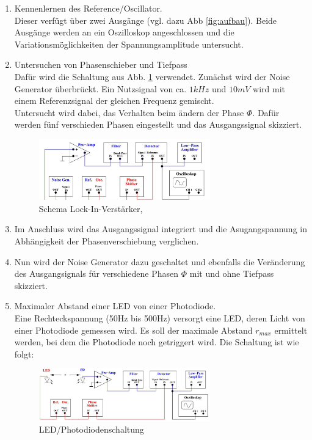 \begin{enumerate}
\item Kennenlernen des Reference/Oscillator.\\ Dieser verfügt über zwei
Ausgänge (vgl. dazu Abb \ref{fig:aufbau}).
Beide Ausgänge werden an ein Oszilloskop angeschlossen und die Variationsmöglichkeiten
der Spannungsamplitude untersucht. 
\item Untersuchen von Phasenschieber und Tiefpass\\
Dafür wird die Schaltung aus Abb. \ref{fig:aufbau_schema2} verwendet.
Zunächst wird der Noise Generator überbrückt. Ein Nutzsignal von ca. $1kHz$ und $10mV$
wird mit einem Referenzsignal der gleichen Frequenz gemischt.\\
Untersucht wird dabei, das Verhalten beim ändern der Phase $\Phi$.
Dafür werden fünf verschieden Phasen eingestellt und das Ausgangssignal skizziert.
\begin{figure}[H]
    \centering
    \includegraphics[width=0.7\textwidth]{bilder/aufbau_schema2.jpg}
    \caption{Schema Lock-In-Verstärker,\cite[4]{Anleitung}}
    \label{fig:aufbau_schema2}
\end{figure}
\item Im Anschluss wird das Ausgangssignal integriert und die Asugangspannung
in Abhängigkeit der Phasenverschiebung verglichen.
\item Nun wird der Noise Generator dazu geschaltet und ebenfalls
die Veränderung des Ausgangsignals für verschiedene Phasen $\Phi$ mit und ohne Tiefpass
skizziert.
\item Maximaler Abstand einer LED von einer Photodiode.\\
Eine Rechteckspannung (50Hz bis 500Hz) versorgt eine LED, deren
Licht von einer Photodiode gemessen wird. Es soll der maximale Abstand $r_{max}$
ermittelt werden, bei dem die Photodiode noch getriggert wird.
Die Schaltung ist wie folgt:
\begin{figure}[H]
    \centering
    \includegraphics[width=0.7\textwidth]{bilder/LED.jpg}
    \caption{LED/Photodiodenschaltung \cite[5]{Anleitung}}
    \label{fig:LED}
\end{figure}  
\end{enumerate}